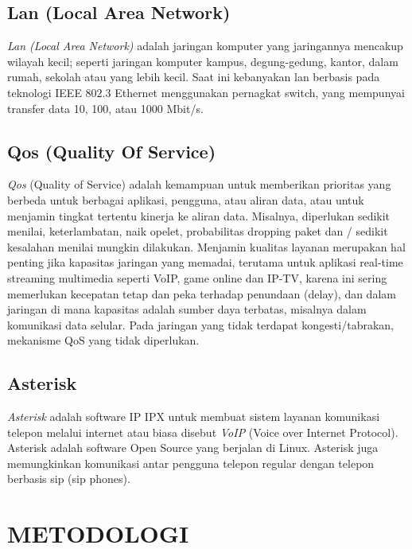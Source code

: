 \documentclass{jtetiproposalskripsi}
\begin{document}
\section{Lan (Local Area Network)}
\emph{Lan (Local Area Network)} adalah jaringan komputer yang jaringannya mencakup wilayah kecil; seperti jaringan komputer kampus, degung-gedung, kantor, dalam rumah, sekolah atau yang lebih kecil. Saat ini kebanyakan  lan berbasis pada teknologi IEEE 802.3 Ethernet menggunakan pernagkat switch, yang mempunyai transfer data 10, 100, atau 1000 Mbit/s.

\section{Qos (Quality Of Service)}
\emph{Qos} (Quality of Service) adalah kemampuan untuk memberikan prioritas yang berbeda untuk berbagai aplikasi, pengguna, atau aliran data, atau untuk menjamin tingkat tertentu kinerja ke aliran data. Misalnya, diperlukan sedikit menilai, keterlambatan, naik opelet, probabilitas dropping paket dan / sedikit kesalahan menilai mungkin dilakukan. Menjamin kualitas layanan merupakan hal penting jika kapasitas jaringan yang memadai, terutama untuk aplikasi real-time streaming multimedia seperti VoIP, game online dan IP-TV, karena ini sering memerlukan kecepatan tetap dan peka terhadap penundaan (delay), dan dalam jaringan di mana kapasitas adalah sumber daya terbatas, misalnya dalam komunikasi data selular. Pada jaringan yang tidak terdapat kongesti/tabrakan, mekanisme QoS yang tidak diperlukan.

\section{Asterisk}
\emph{Asterisk} adalah software IP IPX untuk membuat sistem layanan komunikasi telepon melalui internet atau biasa disebut \emph{VoIP} (Voice over Internet Protocol). Asterisk adalah software Open Source yang berjalan di Linux. Asterisk juga memungkinkan komunikasi antar pengguna telepon regular dengan telepon berbasis sip (sip phones).

\chapter{METODOLOGI}
\end{document}

